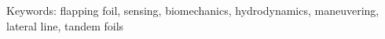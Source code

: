 \documentclass[10pt]{article}
\begin{document}
{\scriptsize Keywords: flapping foil, sensing, biomechanics, hydrodynamics, maneuvering, lateral line, tandem foils}
\tableofcontents
 
 








%
\end{document}
